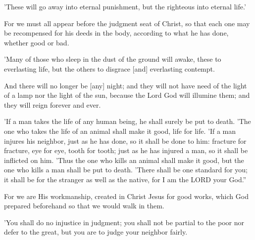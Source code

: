 \begin{scripture}[Matthew 25:46]
    'These will go away into eternal punishment, but the righteous into eternal life.'
\end{scripture}

\begin{scripture}[2 Corinthians 5:10]
    For we must all appear before the judgment seat of Christ, so that each one may be recompensed for his deeds in the body, according to what he has done, whether good or bad.
\end{scripture}

\begin{scripture}[Daniel 12:2]
    'Many of those who sleep in the dust of the ground will awake, these to everlasting life, but the others to disgrace [and] everlasting contempt.
\end{scripture}

\begin{scripture}[Revelation 22:5]
    And there will no longer be [any] night; and they will not have need of the light of a lamp nor the light of the sun, because the Lord God will illumine them; and they will reign forever and ever.
\end{scripture}

\begin{scripture}[Leviticus 24:17-22]
    'If a man takes the life of any human being, he shall surely be put to death.
    'The one who takes the life of an animal shall make it good, life for life.
    'If a man injures his neighbor, just as he has done, so it shall be done to him:
    fracture for fracture, eye for eye, tooth for tooth; just as he has injured a man, so it shall be inflicted on him.
    'Thus the one who kills an animal shall make it good, but the one who kills a man shall be put to death.
    'There shall be one standard for you; it shall be for the stranger as well as the native, for I am the LORD your God.''
\end{scripture}

\begin{scripture}[Ephesians 2:10]
    For we are His workmanship, created in Christ Jesus for good works, which God prepared beforehand so that we would walk in them.
\end{scripture}

\begin{scripture}[Leviticus 19:15]
    'You shall do no injustice in judgment; you shall not be partial to the poor nor defer to the great, but you are to judge your neighbor fairly.
\end{scripture}

